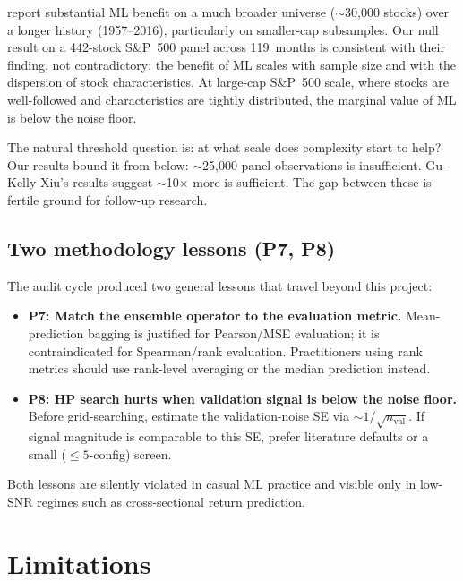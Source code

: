 \documentclass[11pt]{article}
\begin{document}
\citet{gu_kelly_xiu} report substantial ML benefit on a much broader
universe ($\sim$30{,}000 stocks) over a longer history (1957--2016),
particularly on smaller-cap subsamples. Our null result on a 442-stock
S\&P~500 panel across 119~months is consistent with their finding,
not contradictory: the benefit of ML scales with sample size and with
the dispersion of stock characteristics. At large-cap S\&P~500 scale,
where stocks are well-followed and characteristics are tightly
distributed, the marginal value of ML is below the noise floor.

The natural threshold question is: at what scale does complexity start
to help? Our results bound it from below: $\sim$25{,}000 panel
observations is insufficient. Gu-Kelly-Xiu's results suggest
$\sim$10$\times$ more is sufficient. The gap between these is fertile
ground for follow-up research.

\subsection{Two methodology lessons (P7, P8)}

The audit cycle produced two general lessons that travel beyond this
project:

\begin{itemize}[leftmargin=2em,topsep=2pt,itemsep=2pt]
\item \textbf{P7: Match the ensemble operator to the evaluation metric.}
  Mean-prediction bagging is justified for Pearson/MSE evaluation; it
  is contraindicated for Spearman/rank evaluation. Practitioners using
  rank metrics should use rank-level averaging or the median prediction
  instead.
\item \textbf{P8: HP search hurts when validation signal is below the
  noise floor.} Before grid-searching, estimate the validation-noise SE
  via $\sim 1/\sqrt{n_{\text{val}}}$. If signal magnitude is comparable
  to this SE, prefer literature defaults or a small ($\le 5$-config)
  screen.
\end{itemize}

Both lessons are silently violated in casual ML practice and visible
only in low-SNR regimes such as cross-sectional return prediction.

\section{Limitations}\label{sec:limitations}
\end{document}

